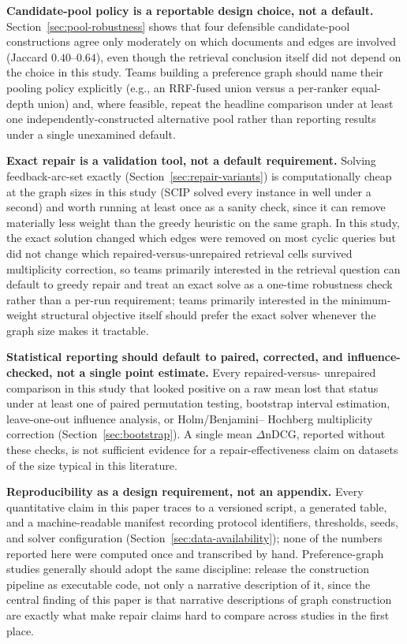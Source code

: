 \documentclass[manuscript,anonymous,review]{acmart}
\begin{document}
\textbf{Candidate-pool policy is a reportable design choice, not a
default.} Section~\ref{sec:pool-robustness} shows that four defensible
candidate-pool constructions agree only moderately on which documents and
edges are involved (Jaccard $0.40$--$0.64$), even though the retrieval
conclusion itself did not depend on the choice in this study. Teams building
a preference graph should name their pooling policy explicitly (e.g., an
RRF-fused union versus a per-ranker equal-depth union) and, where feasible,
repeat the headline comparison under at least one independently-constructed
alternative pool rather than reporting results under a single unexamined
default.

\textbf{Exact repair is a validation tool, not a default requirement.}
Solving feedback-arc-set exactly (Section~\ref{sec:repair-variants}) is
computationally cheap at the graph sizes in this study (SCIP solved every
instance in well under a second) and worth running at least once as a
sanity check, since it can remove materially less weight than the greedy
heuristic on the same graph. In this study, the exact solution changed
which edges were removed on most cyclic queries but did not change which
repaired-versus-unrepaired retrieval cells survived multiplicity
correction, so teams primarily interested in the retrieval question can
default to greedy repair and treat an exact solve as a one-time robustness
check rather than a per-run requirement; teams primarily interested in the
minimum-weight structural objective itself should prefer the exact solver
whenever the graph size makes it tractable.

\textbf{Statistical reporting should default to paired, corrected, and
influence-checked, not a single point estimate.} Every repaired-versus-
unrepaired comparison in this study that looked positive on a raw mean lost
that status under at least one of paired permutation testing, bootstrap
interval estimation, leave-one-out influence analysis, or Holm/Benjamini--
Hochberg multiplicity correction (Section~\ref{sec:bootstrap}). A single
mean $\Delta$nDCG, reported without these checks, is not sufficient evidence
for a repair-effectiveness claim on datasets of the size typical in this
literature.

\textbf{Reproducibility as a design requirement, not an appendix.} Every
quantitative claim in this paper traces to a versioned script, a generated
table, and a machine-readable manifest recording protocol identifiers,
thresholds, seeds, and solver configuration
(Section~\ref{sec:data-availability}); none of the numbers reported here
were computed once and transcribed by hand. Preference-graph studies
generally should adopt the same discipline: release the construction
pipeline as executable code, not only a narrative description of it, since
the central finding of this paper is that narrative descriptions of graph
construction are exactly what make repair claims hard to compare across
studies in the first place.
\end{document}
